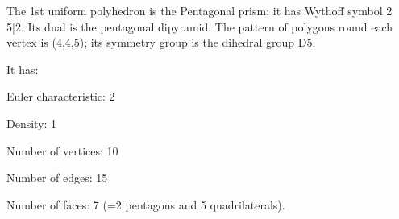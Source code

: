 The 1st uniform polyhedron is the Pentagonal prism; it has Wythoff symbol 2 5|2. Its dual is the pentagonal dipyramid. The pattern of polygons round each vertex is (4,4,5); its symmetry group is the dihedral group D5.\par
It has:\par
Euler characteristic: 2\par
Density: 1\par
Number of vertices: 10\par
Number of edges:  15\par
Number of faces: 7 (=2 pentagons and 5 quadrilaterals).